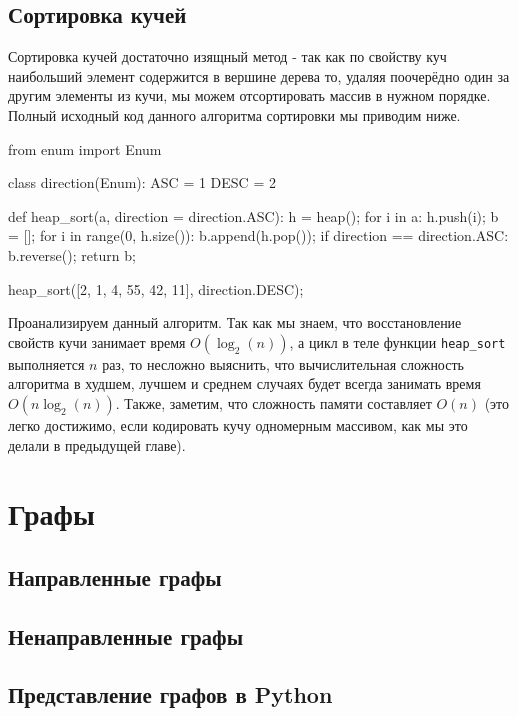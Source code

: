 \subsection{Сортировка кучей}

Сортировка кучей достаточно изящный метод - так как 
по свойству куч наибольший элемент содержится в вершине
дерева то, удаляя поочерёдно один за другим элементы из кучи, 
мы можем отсортировать массив в нужном порядке. Полный исходный 
код данного алгоритма сортировки мы приводим ниже. 

\begin{python}
from enum import Enum

class direction(Enum):
	ASC = 1
	DESC = 2

def heap_sort(a, direction = direction.ASC):
	h = heap();
	for i in a:
		h.push(i);
	b = [];
	for i in range(0, h.size()):
		b.append(h.pop());
	if direction == direction.ASC:
		b.reverse();
	return b;

heap_sort([2, 1, 4, 55, 42, 11], direction.DESC);
\end{python}

Проанализируем данный алгоритм. Так как мы знаем, что 
восстановление свойств кучи занимает время $O(\log_2(n))$, 
а цикл в теле функции \texttt{heap\_sort} 
выполняется $n$ раз, то несложно выяснить, что вычислительная сложность 
алгоритма в худшем, лучшем и среднем случаях будет всегда занимать время $O(n\log_2(n))$.
Также, заметим, что сложность памяти составляет 
$O(n)$ (это легко достижимо, если кодировать кучу 
одномерным массивом, как мы это делали в предыдущей главе).

\section{Графы}

\subsection{Направленные графы}

\subsection{Ненаправленные графы}

\subsection{Представление графов в Python}

